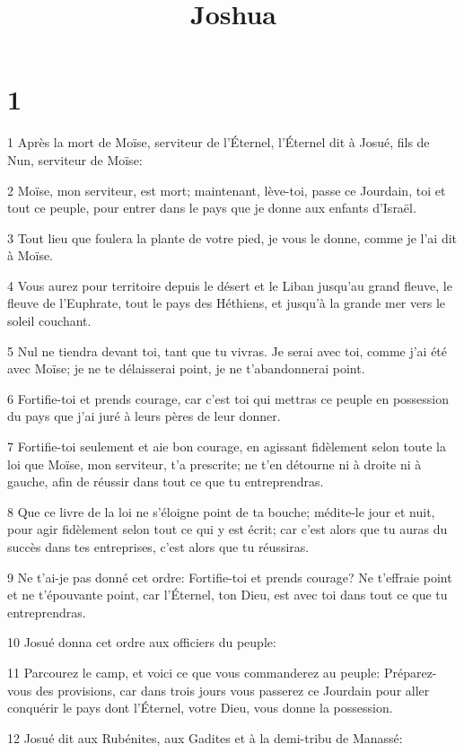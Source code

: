 

\title{Joshua}


\chapter{1}

\par 1 Après la mort de Moïse, serviteur de l'Éternel, l'Éternel dit à Josué, fils de Nun, serviteur de Moïse:
\par 2 Moïse, mon serviteur, est mort; maintenant, lève-toi, passe ce Jourdain, toi et tout ce peuple, pour entrer dans le pays que je donne aux enfants d'Israël.
\par 3 Tout lieu que foulera la plante de votre pied, je vous le donne, comme je l'ai dit à Moïse.
\par 4 Vous aurez pour territoire depuis le désert et le Liban jusqu'au grand fleuve, le fleuve de l'Euphrate, tout le pays des Héthiens, et jusqu'à la grande mer vers le soleil couchant.
\par 5 Nul ne tiendra devant toi, tant que tu vivras. Je serai avec toi, comme j'ai été avec Moïse; je ne te délaisserai point, je ne t'abandonnerai point.
\par 6 Fortifie-toi et prends courage, car c'est toi qui mettras ce peuple en possession du pays que j'ai juré à leurs pères de leur donner.
\par 7 Fortifie-toi seulement et aie bon courage, en agissant fidèlement selon toute la loi que Moïse, mon serviteur, t'a prescrite; ne t'en détourne ni à droite ni à gauche, afin de réussir dans tout ce que tu entreprendras.
\par 8 Que ce livre de la loi ne s'éloigne point de ta bouche; médite-le jour et nuit, pour agir fidèlement selon tout ce qui y est écrit; car c'est alors que tu auras du succès dans tes entreprises, c'est alors que tu réussiras.
\par 9 Ne t'ai-je pas donné cet ordre: Fortifie-toi et prends courage? Ne t'effraie point et ne t'épouvante point, car l'Éternel, ton Dieu, est avec toi dans tout ce que tu entreprendras.
\par 10 Josué donna cet ordre aux officiers du peuple:
\par 11 Parcourez le camp, et voici ce que vous commanderez au peuple: Préparez-vous des provisions, car dans trois jours vous passerez ce Jourdain pour aller conquérir le pays dont l'Éternel, votre Dieu, vous donne la possession.
\par 12 Josué dit aux Rubénites, aux Gadites et à la demi-tribu de Manassé:
